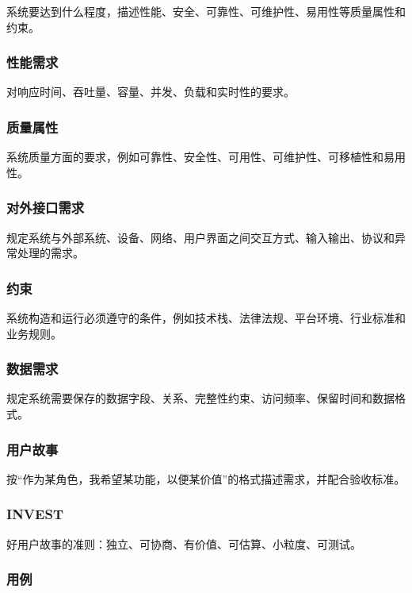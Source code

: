 \documentclass[UTF8,zihao=-4]{ctexart}
\begin{document}
系统要达到什么程度，描述性能、安全、可靠性、可维护性、易用性等质量属性和约束。


\subsubsection*{性能需求}


对响应时间、吞吐量、容量、并发、负载和实时性的要求。


\subsubsection*{质量属性}


系统质量方面的要求，例如可靠性、安全性、可用性、可维护性、可移植性和易用性。


\subsubsection*{对外接口需求}


规定系统与外部系统、设备、网络、用户界面之间交互方式、输入输出、协议和异常处理的需求。


\subsubsection*{约束}


系统构造和运行必须遵守的条件，例如技术栈、法律法规、平台环境、行业标准和业务规则。


\subsubsection*{数据需求}


规定系统需要保存的数据字段、关系、完整性约束、访问频率、保留时间和数据格式。


\subsubsection*{用户故事}


按“作为某角色，我希望某功能，以便某价值”的格式描述需求，并配合验收标准。


\subsubsection*{INVEST}


好用户故事的准则：独立、可协商、有价值、可估算、小粒度、可测试。


\subsubsection*{用例}
\end{document}
